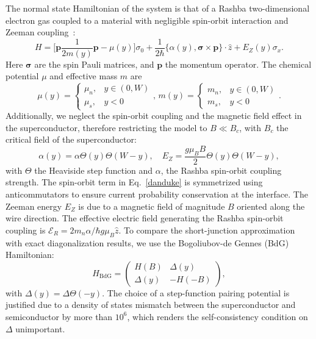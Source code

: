 The normal state Hamiltonian of the system is that of a Rashba two-dimensional electron gas coupled to a material with negligible spin-orbit interaction and Zeeman coupling~\cite{BenDaniel1966}:
\begin{equation}\label{danduke}
H=\bigg[\bm p\frac{1}{2m(y)}\bm p-\mu(y)\bigg]\sigma_0
+\frac{1}{2\hbar}\{\alpha(y),\bm\sigma\times\bm p\}\cdot\hat z
+E_Z(y)\sigma_x.
\end{equation}
Here $\bm{\sigma}$ are the spin Pauli matrices, and $\bm p$ the momentum operator.
The chemical potential $\mu$ and effective mass $m$ are
\begin{equation}
\label{eq:potentials}
\mu(y)=
\begin{cases}
\mu_{n},& y \in(0,W)\\
\mu_s,& y < 0
\end{cases},\,
m(y)=
\begin{cases}
m_{n},& y \in(0,W) \\
m_s,& y < 0
\end{cases}.
\end{equation}
Additionally, we neglect the spin-orbit coupling and the magnetic field effect in the superconductor, therefore restricting the model to $B\ll B_c$, with $B_c$ the critical field of the superconductor:
\begin{equation}
\label{eq:spin_terms}
\alpha(y) = \alpha \Theta(y)\Theta(W-y),\quad E_Z = \frac{g\mu_B B}{2}\Theta(y)\Theta(W-y),
\end{equation}
with $\Theta$ the Heaviside step function and $\alpha$, the Rashba spin-orbit coupling strength.
The spin-orbit term in Eq.~\eqref{danduke} is symmetrized using anticommutators to ensure current probability conservation at the interface.
The Zeeman energy $E_Z$ is due to a magnetic field of magnitude $B$ oriented along the wire direction.
The effective electric field generating the Rashba spin-orbit coupling is $\bm{\mathcal E}_R= 2m_n\alpha /\hbar g\mu_B\hat z$.
To compare the short-junction approximation with exact diagonalization results, we use the Bogoliubov-de Gennes (BdG) Hamiltonian:
\begin{equation}\label{sc}
H_\textrm{BdG}=\begin{pmatrix}H(B) & \Delta(y) \\ \Delta(y) & -H(-B)\end{pmatrix},
\end{equation}
with $\Delta(y) = \Delta \Theta(-y)$.
The choice of a step-function pairing potential is justified due to a density of states mismatch between the superconductor and semiconductor by more than $10^6$, which renders the self-consistency condition on $\Delta$ unimportant.

